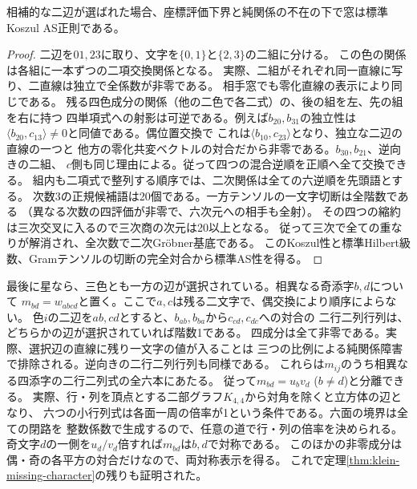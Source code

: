 \begin{lemma}[相補的な二つの選択辺]\label{lem:klein-matching-pbw}
相補的な二辺が選ばれた場合、座標評価下界と純関係の不在の下で窓は標準Koszul AS正則である。
\end{lemma}
\begin{proof}
二辺を$01,23$に取り、文字を$\{0,1\}$と$\{2,3\}$の二組に分ける。
この色の関係は各組に一本ずつの二項交換関係となる。
実際、二組がそれぞれ同一直線に写り、二直線は独立で全係数が非零である。
相手窓でも零化直線の表示により同じである。
残る四色成分の関係（他の二色で各二式）の、後の組を左、先の組を右に持つ
四単項式への射影は可逆である。例えば$b_{20},b_{31}$の独立性は
$\langle b_{20},c_{13}\rangle\ne0$と同値である。偶位置交換で
これは$\langle b_{10},c_{23}\rangle$となり、独立な二辺の直線の一つと
他方の零化共変ベクトルの対合だから非零である。$b_{30},b_{21}$、逆向きの二組、
$c$側も同じ理由による。従って四つの混合逆順を正順へ全て交換できる。
組内も二項式で整列する順序では、二次関係は全ての六逆順を先頭語とする。
次数3の正規候補語は20個である。一方テンソルの一文字切断は全階数である
（異なる次数の四評価が非零で、六次元への相手も全射）。
その四つの縮約は三次交叉に入るので三次商の次元は20以上となる。
従って三次で全ての重なりが解消され、全次数で二次Gr\"obner基底である。
このKoszul性と標準Hilbert級数、Gramテンソルの切断の完全対合から標準AS性を得る。
\end{proof}

最後に星なら、三色とも一方の辺が選択されている。相異なる奇添字$b,d$について
$m_{bd}=w_{abcd}$と置く。ここで$a,c$は残る二文字で、偶交換により順序によらない。
色$i$の二辺を$ab,cd$とすると、$b_{ab},b_{ba}$から$c_{cd},c_{dc}$への対合の
二行二列行列は、どちらかの辺が選択されていれば階数1である。
四成分は全て非零である。実際、選択辺の直線に残り一文字の値が入ることは
三つの比例による純関係障害で排除される。逆向きの二行二列行列も同様である。
これらは$m_{ij}$のうち相異なる四添字の二行二列式の全六本にあたる。
従って$m_{bd}=u_b v_d$ ($b\ne d$)と分離できる。
実際、行・列を頂点とする二部グラフ$K_{4,4}$から対角を除くと立方体の辺となり、
六つの小行列式は各面一周の倍率が1という条件である。六面の境界は全ての閉路を
整数係数で生成するので、任意の道で行・列の倍率を決められる。
奇文字$d$の一側を$u_d/v_d$倍すれば$m_{bd}$は$b,d$で対称である。
このほかの非零成分は偶・奇の各平方の対合だけなので、両対称表示を得る。
これで定理\ref{thm:klein-missing-character}の残りも証明された。

